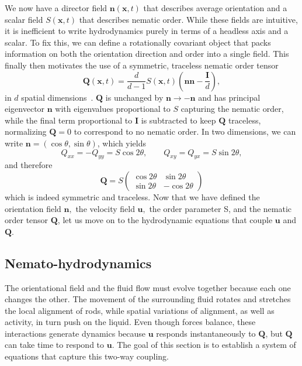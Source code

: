 \documentclass[11pt]{article}
\begin{document}
We now have a director field $\textbf{n}(\textbf{x},t)$ that describes average orientation and a scalar field $S(\textbf{x},t)$ that describes nematic order. While these fields are intuitive, it is inefficient to write hydrodynamics purely in terms of a headless axis and a scalar. To fix this, we can define a rotationally covariant object that packs information on both the orientation direction and order into a single field. This finally then motivates the use of a symmetric, traceless nematic order tensor 
\begin{equation}
\mathbf{Q}(\mathbf{x},t)=\frac{d}{d-1}S(\mathbf{x},t)\!\left(\mathbf{n}\mathbf{n}-\frac{\mathbf{I}}{d}\right),
\end{equation}
in $d$ spatial dimensions~\cite{degennes1993physics, beris1994thermodynamics, Bhattacharyya2024ActiveNematicsMechanobiology}. $\mathbf{Q}$ is unchanged by $\mathbf{n}\to-\mathbf{n}$ and has principal eigenvector $\mathbf{n}$ with eigenvalues proportional to $S$ capturing the nematic order, while the final term proportional to $\mathbf{I}$ is subtracted to keep $\mathbf{Q}$ traceless, normalizing $\mathbf{Q}=0$ to correspond to no nematic order. In two dimensions, we can write $\mathbf{n}=(\cos\theta,\sin\theta)$, which yields $$Q_{xx}=-Q_{yy}=S\cos 2\theta,\qquad Q_{xy}=Q_{yx}=S\sin 2\theta,$$ and therefore
\begin{equation}
    \mathbf{Q} = S\begin{pmatrix}
    \cos 2\theta & \sin 2\theta\\
    \sin 2\theta & -\cos 2\theta
    \end{pmatrix}
\end{equation}
which is indeed symmetric and traceless. Now that we have defined the orientation field $\mathbf{n},$ the velocity field $\mathbf{u},$ the order parameter S, and the nematic order tensor $\mathbf{Q}$, let us move on to the hydrodynamic equations that couple $\mathbf{u}$ and $\mathbf{Q}$. 

\subsection{Nemato-hydrodynamics}
\label{sec:nemato-hydrodynamics}

The orientational field and the fluid flow must evolve together because each one changes the other. The movement of the surrounding fluid rotates and stretches the local alignment of rods, while spatial variations of alignment, as well as activity, in turn push on the liquid. Even though forces balance, these interactions generate dynamics because $\mathbf{u}$ responds instantaneously to $\mathbf{Q}$, but $\mathbf{Q}$ can take time to respond to $\mathbf{u}$. The goal of this section is to establish a system of equations that capture this two-way coupling.
\end{document}
